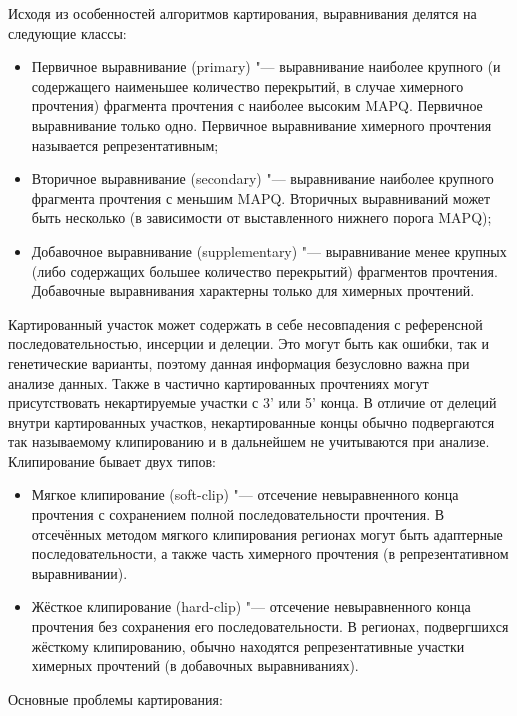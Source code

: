 \documentclass[a4paper,12pt]{article}
\begin{document}
Исходя из особенностей алгоритмов картирования, выравнивания делятся на следующие классы:

\begin{itemize}
\item Первичное выравнивание (primary) "--- выравнивание наиболее крупного (и содержащего наименьшее количество перекрытий, в случае химерного прочтения) фрагмента прочтения с наиболее высоким MAPQ.
Первичное выравнивание только одно.
Первичное выравнивание химерного прочтения называется репрезентативным;
\item Вторичное выравнивание (secondary) "--- выравнивание наиболее крупного фрагмента прочтения с меньшим MAPQ.
Вторичных выравниваний может быть несколько (в зависимости от выставленного нижнего порога MAPQ);
\item Добавочное выравнивание (supplementary) "--- выравнивание менее крупных (либо содержащих большее количество перекрытий) фрагментов прочтения.
Добавочные выравнивания характерны только для химерных прочтений.
\end{itemize}

Картированный участок может содержать в себе несовпадения с референсной последовательностью, инсерции и делеции.
Это могут быть как ошибки, так и генетические варианты, поэтому данная информация безусловно важна при анализе данных.
Также в частично картированных прочтениях могут присутствовать некартируемые участки с 3' или 5' конца.
В отличие от делеций внутри картированных участков, некартированные концы обычно подвергаются так называемому клипированию и в дальнейшем не учитываются при анализе.
Клипирование бывает двух типов:

\begin{itemize}
\item Мягкое клипирование (soft-clip) "--- отсечение невыравненного конца прочтения с сохранением полной последовательности прочтения.
В отсечённых методом мягкого клипирования регионах могут быть адаптерные последовательности, а также часть химерного прочтения (в репрезентативном выравнивании).
\item Жёсткое клипирование (hard-clip) "--- отсечение невыравненного конца прочтения без сохранения его последовательности.
В регионах, подвергшихся жёсткому клипированию, обычно находятся репрезентативные участки химерных прочтений (в добавочных выравниваниях).
\end{itemize}

Основные проблемы картирования:
\end{document}
